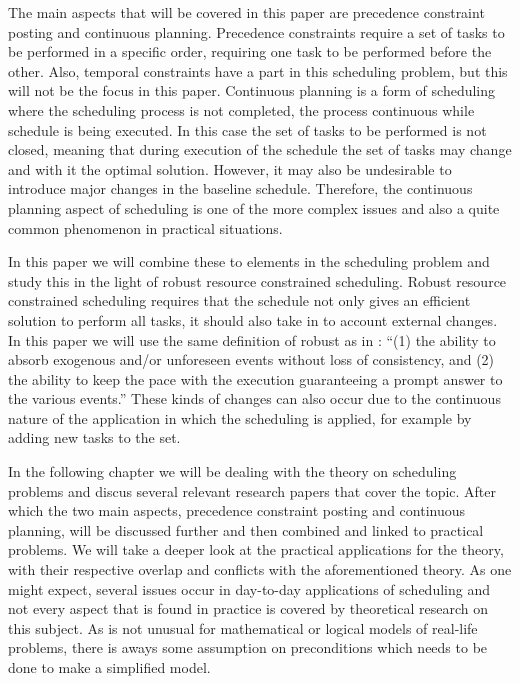 \documentclass{article}
\begin{document}
The main aspects that will be covered in this paper are precedence constraint posting and continuous planning.
Precedence constraints require a set of tasks to be performed in a specific order, requiring one task to be performed before the other.
Also, temporal constraints have a part in this scheduling problem, but this will not be the focus in this paper.
Continuous planning is a form of scheduling where the scheduling process is not completed, the process continuous while schedule is being executed.
In this case the set of tasks to be performed is not closed, meaning that during execution of the schedule the set of tasks may change and with it the optimal solution.
However, it may also be undesirable to introduce major changes in the baseline schedule.
Therefore, the continuous planning aspect of scheduling is one of the more complex issues and also a quite common phenomenon in practical situations.

In this paper we will combine these to elements in the scheduling problem and study this in the light of robust resource constrained scheduling.
Robust resource constrained scheduling requires that the schedule not only gives an efficient solution to perform all tasks, it should also take in to account external changes.
In this paper we will use the same definition of robust as in \cite{policella07} : ``{(1) the ability to absorb exogenous and/or unforeseen events without loss of consistency, and (2) the ability to keep the pace with the execution guaranteeing a prompt answer to the various events.}''
These kinds of changes can also occur due to the continuous nature of the application in which the scheduling is applied, for example by adding new tasks to the set.

In the following chapter we will be dealing with the theory on scheduling problems and discus several relevant research papers that cover the topic.
After which the two main aspects, precedence constraint posting and continuous planning, will be discussed further and then combined and linked to practical problems.
We will take a deeper look at the practical applications for the theory, with their respective overlap and conflicts with the aforementioned theory.
As one might expect, several issues occur in day-to-day applications of scheduling and not every aspect that is found in practice is covered by theoretical research on this subject.
As is not unusual for mathematical or logical models of real-life problems, there is aways some assumption on preconditions which needs to be done to make a simplified model.
\end{document}

